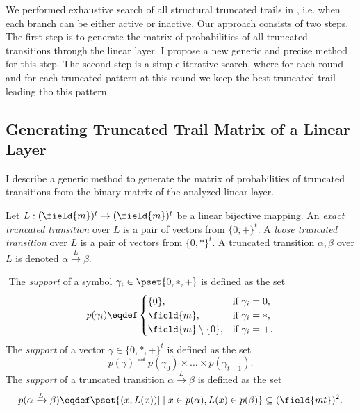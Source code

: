 
We performed exhaustive search of all structural truncated trails in \aCipher{}, i.e. when each branch can be either active or inactive. Our approach consists of two steps. The first step is to generate the matrix of probabilities of all truncated transitions through the linear layer. I propose a new generic and precise method for this step. The second step is a simple iterative search, where for each round and for each truncated pattern at this round we keep the best truncated trail leading tho this pattern.


\subsection{Generating Truncated Trail Matrix of a Linear Layer}
I describe a generic method to generate the matrix of probabilities of truncated transitions from the binary matrix of the analyzed linear layer.

\newcommand\alphabeta{\alpha \xrightarrow{L} \beta}
\newcommand\exact{+}
\newcommand\loose{*}

\newcommand\VA{p(\alpha)}
\newcommand\VB{p(\beta)}

\begin{definition}
Let $L: (\field{m})^t \to (\field{m})^t$ be a linear bijective mapping. An \emph{exact truncated transition} over $L$ is a pair of vectors from $\{0,\exact\}^t$. A \emph{loose truncated transition} over $L$ is a pair of vectors from $\{0, \loose\}^t$. A truncated transition $\alpha, \beta$ over $L$ is denoted $\alphabeta$.
\end{definition}

\begin{definition}
$ $\newline
The \emph{support} of a symbol $\gamma_i \in \pset{0, \loose, \exact}$ is defined as the set
$$
p(\gamma_i) \eqdef
\begin{cases}
\{0\}, &\text{if}~ \gamma_i = 0, \\
\field{m}, &\text{if}~ \gamma_i = \loose, \\
\field{m}\setminus\{0\}, &\text{if}~ \gamma_i = \exact.
\end{cases}
$$
The \emph{support} of a vector $\gamma \in \{0, \loose, \exact\}^t$ is defined as the set
$$
p(\gamma) \eqdef p(\gamma_0) \times \ldots \times p(\gamma_{t-1}).
$$
The \emph{support} of a truncated transition $\alphabeta$ is defined as the set
$$
p(\alphabeta) \eqdef \pset{(x,L(x)) | \mid x \in \VA, L(x) \in \VB} \subseteq (\field{mt})^2.
$$
\end{definition}

